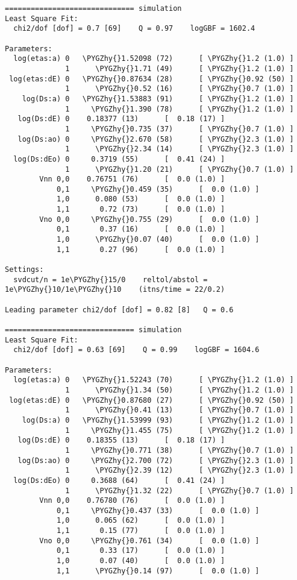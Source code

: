 \documentclass[letterpaper,10pt,english]{sphinxmanual}
\def\PYGZhy{\char`\-}
\begin{document}
\begin{itemize}
\begin{Verbatim}[commandchars=\\\{\}]
============================== simulation
Least Square Fit:
  chi2/dof [dof] = 0.7 [69]    Q = 0.97    logGBF = 1602.4

Parameters:
  log(etas:a) 0   \PYGZhy{}1.52098 (72)      [ \PYGZhy{}1.2 (1.0) ]  
              1      \PYGZhy{}1.71 (49)      [ \PYGZhy{}1.2 (1.0) ]  
 log(etas:dE) 0   \PYGZhy{}0.87634 (28)      [ \PYGZhy{}0.92 (50) ]  
              1      \PYGZhy{}0.52 (16)      [ \PYGZhy{}0.7 (1.0) ]  
    log(Ds:a) 0   \PYGZhy{}1.53883 (91)      [ \PYGZhy{}1.2 (1.0) ]  
              1     \PYGZhy{}1.390 (78)      [ \PYGZhy{}1.2 (1.0) ]  
   log(Ds:dE) 0    0.18377 (13)      [  0.18 (17) ]  
              1     \PYGZhy{}0.735 (37)      [ \PYGZhy{}0.7 (1.0) ]  
   log(Ds:ao) 0     \PYGZhy{}2.670 (58)      [ \PYGZhy{}2.3 (1.0) ]  
              1      \PYGZhy{}2.34 (14)      [ \PYGZhy{}2.3 (1.0) ]  
  log(Ds:dEo) 0     0.3719 (55)      [  0.41 (24) ]  
              1      \PYGZhy{}1.20 (21)      [ \PYGZhy{}0.7 (1.0) ]  
        Vnn 0,0    0.76751 (76)      [  0.0 (1.0) ]  
            0,1     \PYGZhy{}0.459 (35)      [  0.0 (1.0) ]  
            1,0      0.080 (53)      [  0.0 (1.0) ]  
            1,1       0.72 (73)      [  0.0 (1.0) ]  
        Vno 0,0     \PYGZhy{}0.755 (29)      [  0.0 (1.0) ]  
            0,1       0.37 (16)      [  0.0 (1.0) ]  
            1,0      \PYGZhy{}0.07 (40)      [  0.0 (1.0) ]  
            1,1       0.27 (96)      [  0.0 (1.0) ]  

Settings:
  svdcut/n = 1e\PYGZhy{}15/0    reltol/abstol = 1e\PYGZhy{}10/1e\PYGZhy{}10    (itns/time = 22/0.2)

Leading parameter chi2/dof [dof] = 0.82 [8]   Q = 0.6

============================== simulation
Least Square Fit:
  chi2/dof [dof] = 0.63 [69]    Q = 0.99    logGBF = 1604.6

Parameters:
  log(etas:a) 0   \PYGZhy{}1.52243 (70)      [ \PYGZhy{}1.2 (1.0) ]  
              1      \PYGZhy{}1.34 (50)      [ \PYGZhy{}1.2 (1.0) ]  
 log(etas:dE) 0   \PYGZhy{}0.87680 (27)      [ \PYGZhy{}0.92 (50) ]  
              1      \PYGZhy{}0.41 (13)      [ \PYGZhy{}0.7 (1.0) ]  
    log(Ds:a) 0   \PYGZhy{}1.53999 (93)      [ \PYGZhy{}1.2 (1.0) ]  
              1     \PYGZhy{}1.455 (75)      [ \PYGZhy{}1.2 (1.0) ]  
   log(Ds:dE) 0    0.18355 (13)      [  0.18 (17) ]  
              1     \PYGZhy{}0.771 (38)      [ \PYGZhy{}0.7 (1.0) ]  
   log(Ds:ao) 0     \PYGZhy{}2.700 (72)      [ \PYGZhy{}2.3 (1.0) ]  
              1      \PYGZhy{}2.39 (12)      [ \PYGZhy{}2.3 (1.0) ]  
  log(Ds:dEo) 0     0.3688 (64)      [  0.41 (24) ]  
              1      \PYGZhy{}1.32 (22)      [ \PYGZhy{}0.7 (1.0) ]  
        Vnn 0,0    0.76780 (76)      [  0.0 (1.0) ]  
            0,1     \PYGZhy{}0.437 (33)      [  0.0 (1.0) ]  
            1,0      0.065 (62)      [  0.0 (1.0) ]  
            1,1       0.15 (77)      [  0.0 (1.0) ]  
        Vno 0,0     \PYGZhy{}0.761 (34)      [  0.0 (1.0) ]  
            0,1       0.33 (17)      [  0.0 (1.0) ]  
            1,0       0.07 (40)      [  0.0 (1.0) ]  
            1,1      \PYGZhy{}0.14 (97)      [  0.0 (1.0) ]  


\end{Verbatim}
\end{itemize}
\end{document}
